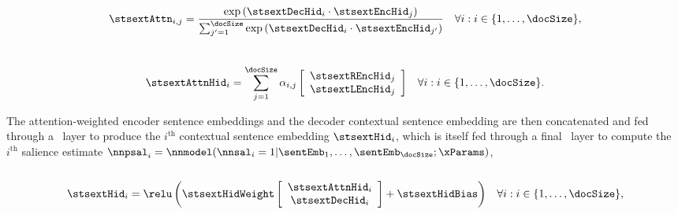 \noindent{}\\[-20pt]
\begin{align}
    \stsextAttn_{i,j} & = 
        \frac{\exp \left(\stsextDecHid_i \cdot  \stsextEncHid_j \right)}{
            \sum_{j^\prime=1}^{\docSize}\exp\left(  
                \stsextDecHid_i \cdot  \stsextEncHid_{j^\prime} \right)} &
    \forall i : i \in \{1,\ldots,\docSize\}, 
\end{align}
\noindent{}\\[-20pt]
\begin{align}
    \stsextAttnHid_i & = 
        \sum_{j=1}^{\docSize} \alpha_{i,j} \left[\begin{array}{c}
            \stsextREncHid_j\\ 
            \stsextLEncHid_j\end{array}\right] & 
    \forall i : i \in \{1,\ldots,\docSize\}.
\end{align}

The attention-weighted encoder sentence embeddings and the decoder contextual
sentence embedding are then concatenated and fed through a \feedforward~layer
to produce the $i^\textrm{th}$ contextual sentence embedding $\stsextHid_i$,
which is itself fed through a final \feedforward~layer to compute the
$i^\textrm{th}$ salience estimate $\nnpsal_i =
\nnmodel(\nnsal_i=1|\sentEmb_1,\ldots,\sentEmb_\docSize;\xParams)$,\\

\noindent{}\\[-20pt]
\begin{align}
    \stsextHid_i &= \relu\left(\stsextHidWeight \left[\begin{array}{c}
        \stsextAttnHid_i \\ 
        \stsextDecHid_i \end{array}\right] 
        + \stsextHidBias \right) &
    \forall i : i \in \{1,\ldots,\docSize\},
\end{align}


